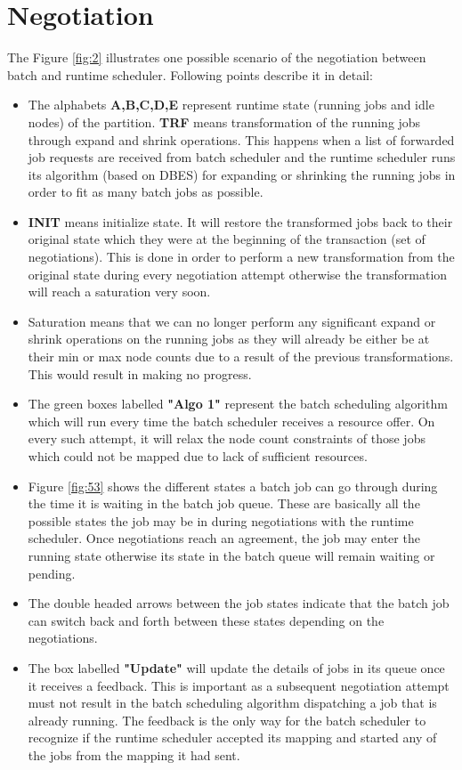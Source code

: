 \section{Negotiation}
The Figure \ref{fig:2} illustrates one possible scenario of the negotiation between batch and runtime scheduler. Following points describe it in detail:
\begin{itemize}
\item The alphabets \textbf{A,B,C,D,E} represent runtime state (running jobs and idle nodes) of the partition. \textbf{TRF} means transformation of the running jobs through expand and shrink operations. This happens when a list of forwarded job requests are received from batch scheduler and the runtime scheduler runs its algorithm (based on DBES) for expanding or shrinking the running jobs in order to fit as many batch jobs as possible.
\item \textbf{INIT} means initialize state. It will restore the transformed jobs back to their original state which they were at the beginning of the transaction (set of negotiations). This is done in order to perform a new transformation from the original state during every negotiation attempt otherwise the transformation will reach a saturation very soon.
\item Saturation means that we can no longer perform any significant expand or shrink operations on the running jobs as they will already be either be at their min or max node counts due to a result of the previous transformations. This would result in making no progress.
\item The green boxes labelled \textbf{"Algo 1"} represent the batch scheduling algorithm which will run every time the batch scheduler receives a resource offer. On every such attempt, it will relax the node count constraints of those jobs which could not be mapped due to lack of sufficient resources.
\item Figure \ref{fig:53} shows the different states a batch job can go through during the time it is waiting in the batch job queue. These are basically all the possible states the job may be in during negotiations with the runtime scheduler. Once negotiations reach an agreement, the job may enter the running state otherwise its state in the batch queue will remain waiting or pending.
\item The double headed arrows between the job states indicate that the batch job can switch back and forth between these states depending on the negotiations.
\item The box labelled \textbf{"Update"} will update the details of jobs in its queue once it receives a feedback. This is important as a subsequent negotiation attempt must not result in the batch scheduling algorithm dispatching a job that is already running. The feedback is the only way for the batch scheduler to recognize if the runtime scheduler accepted its mapping and started any of the jobs from the mapping it had sent.  

\end{itemize}
